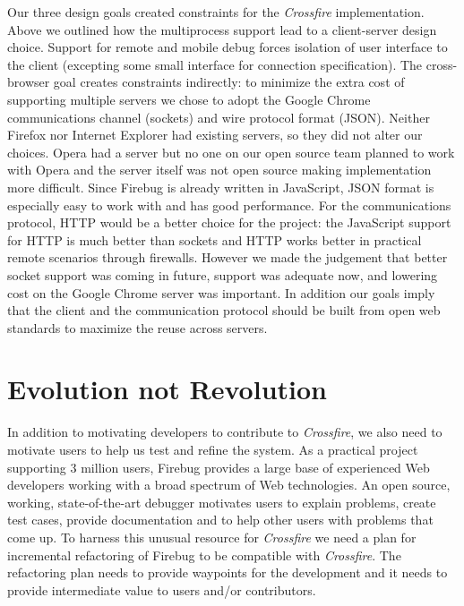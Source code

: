 Our three design goals created constraints for the \textit{Crossfire} implementation.
Above we outlined
how the multiprocess support lead to a client-server design choice. Support for
remote and mobile debug forces isolation of user interface to the client
(excepting some small interface for connection specification). The cross-browser
goal creates constraints indirectly: to minimize the extra cost of supporting
multiple servers we chose to adopt the Google Chrome communications channel
(sockets) and wire protocol format (JSON). Neither Firefox nor Internet Explorer
had existing servers, so they did not alter our choices. Opera had a server but
no one on our open source team planned to work with Opera and the server itself
was not open source making implementation more difficult.  Since Firebug is
already written in JavaScript, JSON format is especially easy to work with and
has good performance\cite{JSON}.  For the communications protocol, HTTP would be
a better choice for the project: the JavaScript support for HTTP is much better
than sockets and HTTP works better in practical remote scenarios through
firewalls.  However we made the judgement that better socket support was coming
in future\cite{WebSockets}, support was adequate now, and lowering cost on the
Google Chrome server was important.  In addition our goals imply that the
client and the communication protocol should be built from open web standards to
maximize the reuse across servers.

\section{Evolution not Revolution}
In addition to motivating developers to contribute to \textit{Crossfire}, we also need to motivate users
to help us test and refine the system.
As a practical project supporting 3 million users, Firebug
provides a large base of experienced Web developers working with a broad spectrum of Web technologies.
An open source, working, state-of-the-art debugger motivates users to explain problems, create test cases,
provide documentation and to help other users with problems that come up. To harness this
 unusual resource  for \textit{Crossfire} we need a plan for incremental refactoring of Firebug to be compatible
with \textit{Crossfire}.  The refactoring plan needs to provide waypoints for the development and it needs to
provide intermediate value to users and/or contributors.

